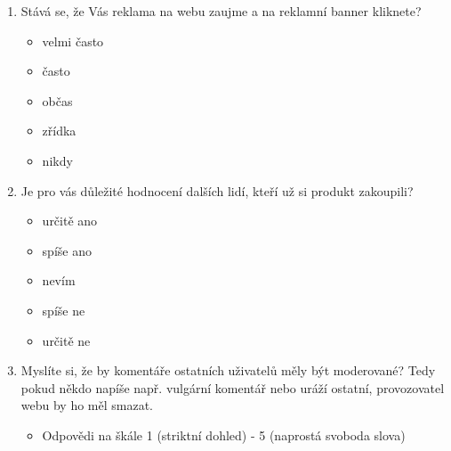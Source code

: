 \documentclass[12pt,oneside,openany]{fithesis}
\begin{document}
\begin{enumerate}
  \item Stává se, že Vás reklama na webu zaujme a na reklamní banner kliknete?
    \begin{itemize}
       \item velmi často
       \item často
       \item občas
       \item zřídka
       \item nikdy
    \end{itemize}

  \item Je pro vás důležité hodnocení dalších lidí, kteří už si produkt zakoupili?
    \begin{itemize}
       \item určitě ano
       \item spíše ano
       \item nevím
       \item spíše ne
       \item určitě ne
    \end{itemize}

  \item Myslíte si, že by komentáře ostatních uživatelů měly být moderované?
      Tedy pokud někdo napíše např. vulgární komentář nebo uráží ostatní, provozovatel webu by ho měl smazat.
    \begin{itemize}
        \item Odpovědi na škále 1 (striktní dohled) - 5 (naprostá svoboda slova)
    \end{itemize}

\end{enumerate}
\end{document}
